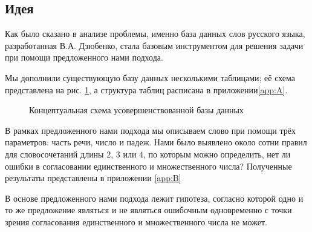\documentclass[main]{subfiles}
\begin{document}
\subsection{Идея}

Как было сказано в анализе проблемы, именно база данных слов русского языка, разработанная В.А. Дзюбенко, стала базовым инструментом для решения задачи при помощи предложенного нами подхода.

Мы дополнили существующую базу данных несколькими таблицами; её схема представлена на рис. \ref{img1}, а структура таблиц расписана в приложении\ref{app:A}.


\begin{figure}[h]
	\begin{minipage}[h]{\linewidth}
			\captionsetup{format=hang,labelsep = endash}
		\caption{Концептуальная схема усовершенствованной базы данных}\label{img1}
	\end{minipage}
\end{figure}

В рамках предложенного нами подхода мы описываем слово при помощи трёх параметров: часть речи, число и падеж. Нами было выявлено около сотни правил для словосочетаний длины $2$, $3$ или $4$, по которым можно определить, нет ли ошибки в согласовании единственного и множественного числа? Полученные результаты представлены в приложении \ref{app:B}

В основе предложенного нами подхода лежит гипотеза, согласно которой одно и то же предложение являться и не являться ошибочным одновременно с точки зрения согласования единственного и множественного числа не может. 
\end{document}
